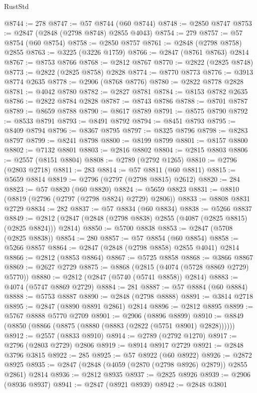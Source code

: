 \begin{lexlean}{RustStd}
\begin{coremodule}
@8744 := 278
@8747 := @57 @8744 (@60 @8744)
@8748 := @2850 @8747
@8753 := @2847 (@2848 (@2798 @8748) @2855 @4043)
@8754 := 279
@8757 := @57 @8754 (@60 @8754)
@8758 := @2850 @8757
@8761 := @2848 (@2798 @8758) @2855
@8763 := @3225 (@3226 @1759)
@8766 := @2847 (@8761 @8763) @2814
@8767 := @8753 @8766
@8768 := @2812 @8767
@8770 := @2822 (@2825 @8748)
@8773 := @2822 (@2825 @8758) @2828
@8774 := @8770 @8773
@8776 := @3913 @8774 @2635
@8778 := @2906 (@8768 @8776)
@8780 := @2822 @8778 @2828
@8781 := @4042 @8780
@8782 := @2827 @8781
@8784 := @8153 @8782 @2635
@8786 := @2822 @8784 @2828
@8787 := @8743 @8786
@8788 := @8701 @8787
@8789 := @8659 @8788
@8790 := @8617 @8789
@8791 := @8575 @8790
@8792 := @8533 @8791
@8793 := @8491 @8792
@8794 := @8451 @8793
@8795 := @8409 @8794
@8796 := @8367 @8795
@8797 := @8325 @8796
@8798 := @8283 @8797
@8799 := @8241 @8798
@8800 := @8199 @8799
@8801 := @8157 @8800
@8802 := @7132 @8801
@8803 := @2816 @8802
@8804 := @2815 @8803
@8806 := @2557 (@8151 @8804)
@8808 := @2789 (@2792 @1265)
@8810 := @2796 (@2803 @2718)
@8811 := 283
@8814 := @57 @8811 (@60 @8811)
@8815 := @5659 @8814
@8819 := @2796 (@2797 (@2798 @8815) @2612)
@8820 := 284
@8823 := @57 @8820 (@60 @8820)
@8824 := @5659 @8823
@8831 := @8810 (@8819 (@2796 (@2797 (@2798 @8824) @2729) @2806))
@8833 := @8808 @8831 @2729
@8834 := 282
@8837 := @57 @8834 (@60 @8834)
@8838 := @5266 @8837
@8849 := @2812 (@2847 (@2848 (@2798 @8838) @2855 (@4087 (@2825 @8815) (@2825 @8824))) @2814)
@8850 := @5700 @8838
@8853 := @2847 (@5708 (@2825 @8838))
@8854 := 280
@8857 := @57 @8854 (@60 @8854)
@8858 := @5266 @8857
@8864 := @2847 (@2848 (@2798 @8858) @2855 @4041) @2814
@8866 := @2812 (@8853 @8864)
@8867 := @5725 @8858
@8868 := @3866 @8867
@8869 := @2627 @2729
@8875 := @8868 (@2815 (@4074 (@5728 @8869 @2729) @5770))
@8880 := @2812 (@2847 (@5740 (@5741 @8858)) @2814)
@8883 := @4074 (@5747 @8869 @2729)
@8884 := 281
@8887 := @57 @8884 (@60 @8884)
@8888 := @5753 @8887
@8890 := @2848 (@2798 @8888)
@8891 := @3814 @2718
@8895 := @2847 (@8890 @8891 @2861) @2814
@8896 := @2812 @8895
@8899 := @5767 @8888 @5770 @2709
@8901 := @2906 (@8896 @8899)
@8910 := @8849 (@8850 (@8866 (@8875 (@8880 (@8883 (@2822 (@5751 @8901) @2828))))))
@8912 := @2557 (@8833 @8910)
@8914 := @2789 (@2792 @1270)
@8917 := @2796 (@2803 @2729) @2806
@8919 := @8914 @8917 @2729
@8921 := @2848 @3796 @3815
@8922 := 285
@8925 := @57 @8922 (@60 @8922)
@8926 := @2872 @8925
@8935 := @2847 (@2848 (@4059 (@2870 (@2798 @8926) @2879)) @2855 @2861) @2814
@8936 := @2812 @8935
@8937 := @2825 @8926
@8939 := @2906 (@8936 @8937)
@8941 := @2847 (@8921 @8939)
@8942 := @2848 @3801

\end{coremodule}
\end{lexlean}
